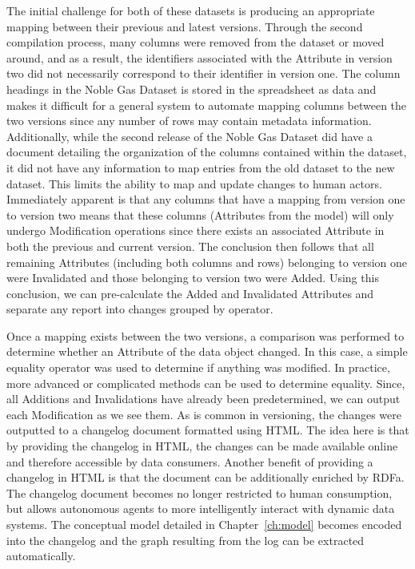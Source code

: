 The initial challenge for both of these datasets is producing an appropriate mapping between their previous and latest versions.  Through the second compilation process, many columns were removed from the dataset or moved around, and as a result, the identifiers associated with the Attribute in version two did not necessarily correspond to their identifier in version one.  The column headings in the Noble Gas Dataset is stored in the spreadsheet as data and makes it difficult for a general system to automate mapping columns between the two versions since any number of rows may contain metadata information.  Additionally, while the second release of the Noble Gas Dataset did have a document detailing the organization of the columns contained within the dataset, it did not have any information to map entries from the old dataset to the new dataset.  This limits the ability to map and update changes to human actors.  Immediately apparent is that any columns that have a mapping from version one to version two means that these columns (Attributes from the model) will only undergo Modification operations since there exists an associated Attribute in both the previous and current version.  The conclusion then follows that all remaining Attributes (including both columns and rows) belonging to version one were Invalidated and those belonging to version two were Added.  Using this conclusion, we can pre-calculate the Added and Invalidated Attributes and separate any report into changes grouped by operator.

Once a mapping exists between the two versions, a comparison was performed to determine whether an Attribute of the data object changed.  In this case, a simple equality operator was used to determine if anything was modified.  In practice, more advanced or complicated methods can be used to determine equality.  Since, all Additions and Invalidations have already been predetermined, we can output each Modification as we see them.  As is common in versioning, the changes were outputted to a changelog document formatted using HTML.  The idea here is that by providing the changelog in HTML, the changes can be made available online and therefore accessible by data consumers.  Another benefit of providing a changelog in HTML is that the document can be additionally enriched by RDFa.  The changelog document becomes no longer restricted to human consumption, but allows autonomous agents to more intelligently interact with dynamic data systems.  The conceptual model detailed in Chapter~\ref{ch:model} becomes encoded into the changelog and the graph resulting from the log can be extracted automatically.

